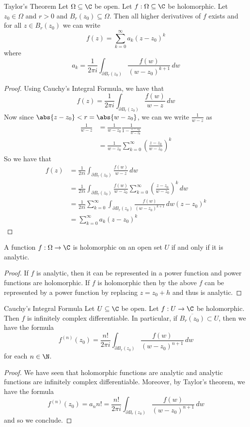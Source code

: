 \documentclass[a4paper]{article}
\begin{document}
\begin{thm}{Taylor's Theorem}{} Let $\Omega\subseteq\C$ be open. Let $f:\Omega\subseteq\C$ be holomorphic. Let $z_0\in\Omega$ and $r>0$ and $B_r(z_0)\subseteq\Omega$. Then all higher derivatives of $f$ exists and for all $z\in B_r(z_0)$ we can write $$f(z)=\sum_{k=0}^\infty a_k(z-z_0)^k$$ where $$a_k=\frac{1}{2\pi i}\int_{\partial B_r(z_0)}\frac{f(w)}{(w-z_0)^{k+1}}\,dw$$ \tcbline
\begin{proof} Using Cauchy's Integral Formula, we have that $$f(z)=\frac{1}{2\pi i}\int_{\partial B_r(z_0)}\frac{f(w)}{w-z}\,dw$$ Now since $\abs{z-z_0}<r=\abs{w-z_0}$, we can we write $\frac{1}{w-z}$ as 
\begin{align*}
\frac{1}{w-z}&=\frac{1}{w-z_0}\frac{1}{1-\frac{z-z_0}{w-z_0}}\\
&=\frac{1}{w-z_0}\sum_{k=0}^\infty\left(\frac{z-z_0}{w-z_0}\right)^k
\end{align*}
So we have that 
\begin{align*}
f(z)&=\frac{1}{2\pi i}\int_{\partial B_r(z_0)}\frac{f(w)}{w-z}\,dw\\
&=\frac{1}{2\pi i}\int_{\partial B_r(z_0)}\frac{f(w)}{w-z_0}\sum_{k=0}^\infty\left(\frac{z-z_0}{w-z_0}\right)^k\,dw\\
&=\frac{1}{2\pi i}\sum_{k=0}^\infty\int_{\partial B_r(z_0)}\frac{f(w)}{(w-z_0)^{k+1}}\,dw(z-z_0)^k\\
&=\sum_{k=0}^\infty a_k(z-z_0)^k
\end{align*}
\end{proof}
\end{thm}

\begin{crl}{}{} A function $f:\Omega\to\C$ is holomorphic on an open set $U$ if and only if it is analytic. \tcbline
\begin{proof} If $f$ is analytic, then it can be represented in a power function and power functions are holomorphic. If $f$ is holomorphic then by the above $f$ can be represented by a power function by replacing $z=z_0+h$ and thus is analytic. 
\end{proof}
\end{crl}

\begin{thm}{Cauchy's Integral Formula}{} Let $U\subseteq\C$ be open. Let $f:U\to\C$ be holomorphic. Then $f$ is infinitely complex differentiable. In particular, if $\overline{B_r(z_0)}\subset U$, then we have the formula $$f^{(n)}(z_0)=\frac{n!}{2\pi i}\int_{\partial B_r(z_0)}\frac{f(w)}{(w-z_0)^{n+1}}\,dw$$ for each $n\in\N$. \tcbline
\begin{proof}
We have seen that holomorphic functions are analytic and analytic functions are infinitely complex differentiable. Moreover, by Taylor's theorem, we have the formula $$f^{(n)}(z_0)=a_nn!=\frac{n!}{2\pi i}\int_{\partial B_r(z_0)}\frac{f(w)}{(w-z_0)^{n+1}}\,dw$$ and so we conclude. 
\end{proof}
\end{thm}
\end{document}
